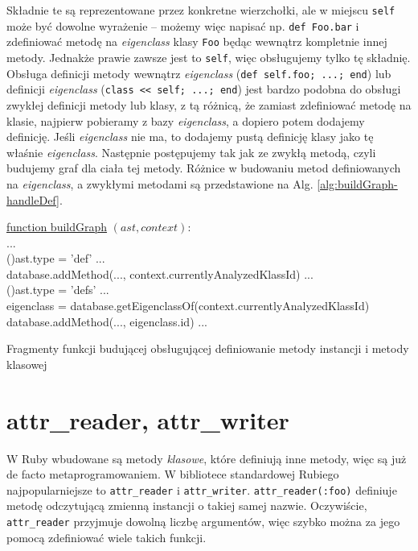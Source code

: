 \documentclass[shortabstract,mgr]{iithesis}
\newcommand{\algsize}{\small}
\begin{document}
Składnie te są reprezentowane przez konkretne wierzchołki, ale w miejscu \texttt{self} może być dowolne wyrażenie -- możemy więc napisać np. \texttt{def Foo.bar} i zdefiniować metodę na \textit{eigenclass} klasy \texttt{Foo} będąc wewnątrz kompletnie innej metody.
Jednakże prawie zawsze jest to \texttt{self}, więc obsługujemy tylko tę składnię.
Obsługa definicji metody wewnątrz \textit{eigenclass} (\texttt{def self.foo; ...; end}) lub definicji \textit{eigenclass} (\texttt{class << self; ...; end}) jest bardzo podobna do obsługi zwykłej definicji metody lub klasy, z tą różnicą, że zamiast zdefiniować metodę na klasie, najpierw pobieramy z bazy \textit{eigenclass}, a dopiero potem dodajemy definicję.
Jeśli \textit{eigenclass} nie ma, to dodajemy pustą definicję klasy jako tę właśnie \textit{eigenclass}. Następnie postępujemy tak jak ze zwykłą metodą, czyli budujemy graf dla ciała tej metody. Różnice w budowaniu metod definiowanych na \emph{eigenclass}, a zwykłymi metodami są przedstawione na Alg. \ref{alg:buildGraph-handleDef}.

\begin{algorithm}
    \algsize
    \underline{function buildGraph} $(ast, context)$:\\
    ...\\
    \If(){ast.type = 'def'}{
        ...\\
        database.addMethod(..., context.currentlyAnalyzedKlassId)\;
        ...\\
    }
    \If(){ast.type = 'defs'}{
        ...\\
        eigenclass = database.getEigenclassOf(context.currentlyAnalyzedKlassId)\;
        database.addMethod(..., eigenclass.id)\;
        ...\\
    }
    \caption{Fragmenty funkcji budującej obsługującej definiowanie metody instancji i metody klasowej}
    \label{alg:buildGraph-handleDef}
\end{algorithm}


\section{attr\_reader, attr\_writer}

W Ruby wbudowane są metody \textit{klasowe}, które definiują inne metody, więc są już de facto metaprogramowaniem.
W bibliotece standardowej Rubiego najpopularniejsze to \texttt{attr\_reader} i \texttt{attr\_writer}.
\texttt{attr\_reader(:foo)} definiuje metodę odczytującą zmienną instancji o takiej samej nazwie. Oczywiście, \texttt{attr\_reader} przyjmuje dowolną liczbę argumentów, więc szybko można za jego pomocą zdefiniować wiele takich funkcji.
\end{document}
